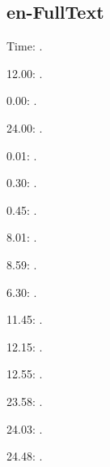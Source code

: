 \documentclass{article}
\begin{document}
\subsection{en-FullText}

Time: \DTMcurrenttime.

12.00: .

0.00: .

24.00: .

0.01: .

0.30: .

0.45: .

8.01: .

8.59: .

6.30: .

11.45: .

12.15: .

12.55: .

23.58: .

24.03: .

24.48: .
\end{document}
